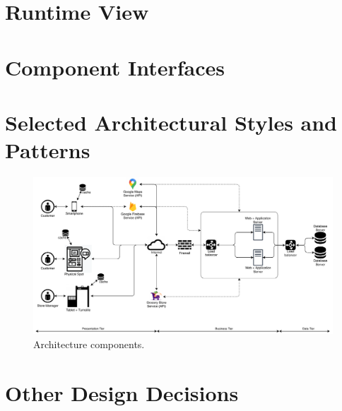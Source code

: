\section{Runtime View}

\section{Component Interfaces}

\section{Selected Architectural Styles and Patterns}

\begin{figure}[H] %
	\centering
	\includegraphics[width=1.0\textwidth]{images/architecture_components.pdf}
	\caption{Architecture components.}
\end{figure} %

\section{Other Design Decisions}